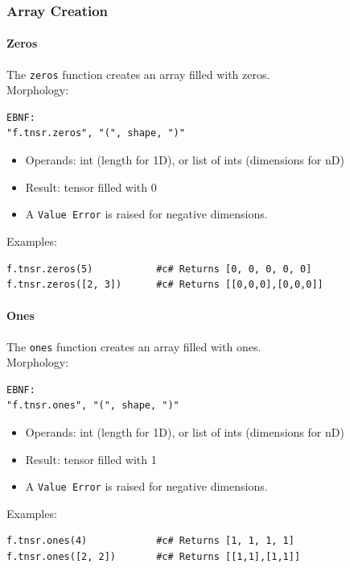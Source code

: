 \subsubsection{Array Creation}

\paragraph{Zeros}
The \texttt{zeros} function creates an array filled with zeros.\\
Morphology:
\begin{verbatim}
EBNF:
"f.tnsr.zeros", "(", shape, ")"
\end{verbatim}
\begin{itemize}
\item Operands: int (length for 1D), or list of ints (dimensions for nD)
\item Result: tensor filled with 0
\item A \texttt{Value Error} is raised for negative dimensions.
\end{itemize}
Examples:
\begin{verbatim}
f.tnsr.zeros(5)           #c# Returns [0, 0, 0, 0, 0]
f.tnsr.zeros([2, 3])      #c# Returns [[0,0,0],[0,0,0]]
\end{verbatim}

\paragraph{Ones}
The \texttt{ones} function creates an array filled with ones.\\
Morphology:
\begin{verbatim}
EBNF:
"f.tnsr.ones", "(", shape, ")"
\end{verbatim}
\begin{itemize}
\item Operands: int (length for 1D), or list of ints (dimensions for nD)
\item Result: tensor filled with 1
\item A \texttt{Value Error} is raised for negative dimensions.
\end{itemize}
Examples:
\begin{verbatim}
f.tnsr.ones(4)            #c# Returns [1, 1, 1, 1]
f.tnsr.ones([2, 2])       #c# Returns [[1,1],[1,1]]
\end{verbatim}

